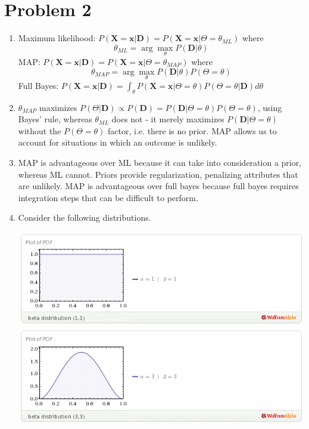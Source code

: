 \documentclass{article}
\begin{document}
\section*{Problem 2}
\begin{enumerate}
\item Maximum likelihood: $P(\mathbf X=\mathbf x | \mathbf D)=P(\mathbf X = \mathbf x | \Theta=\theta_{ML})$
  where $$\theta_{ML} = \arg \max_\theta P(\mathbf D|\theta)$$
  MAP: $P(\mathbf X = \mathbf x | \mathbf D) = P(\mathbf X = \mathbf x | \Theta = \theta_{MAP})$
  where $$\theta_{MAP} = \arg \max_\theta P(\mathbf D | \theta)P(\Theta = \theta)$$
  Full Bayes: $P(\mathbf X = \mathbf x | \mathbf D) = \int_\theta P(\mathbf X = \mathbf x | \Theta = \theta)P(\Theta = \theta | \mathbf D)d\theta$

\item $\theta_{MAP}$ maximizes $P(\Theta|\mathbf D)\propto P(\mathbf D)=P(\mathbf D | \Theta = \theta)P(\Theta = \theta)$,
  using Bayes' rule, whereas $\theta_{ML}$ does not - it merely maximizes $P(\mathbf D | \Theta = \theta)$
  without the $P(\Theta=\theta)$ factor, i.e. there is no prior. MAP allows us to account
  for situations in which an outcome is unlikely. 
\item MAP is advantageous over ML because it can take into consideration
  a prior, whereas ML cannot. Priors provide regularization, penalizing
  attributes that are unlikely. 
  MAP is advantageous over full bayes because full bayes requires
  integration steps that can be difficult to perform. 
\item
  Consider the following distributions.
      \begin{center}
        \includegraphics[scale=.5]{beta_1_1.png}
        \includegraphics[scale=.5]{beta_3_3.png}

\end{center}
\end{enumerate}
\end{document}
